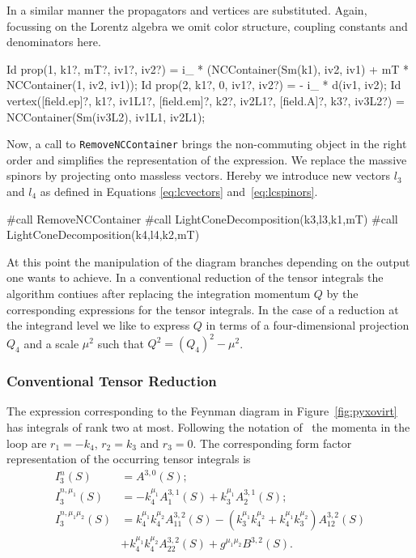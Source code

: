 \documentclass[preprint,number,12pt,sort&compress]{elsarticle}
\begin{document}
In a similar manner the propagators and vertices are substituted. Again,
focussing on the Lorentz algebra we omit color structure, coupling constants
and denominators here.
\begin{spform}
Id prop(1, k1?, mT?, iv1?, iv2?) =
   i_ * (NCContainer(Sm(k1), iv2, iv1)
      + mT * NCContainer(1, iv2, iv1));
Id prop(2, k1?, 0, iv1?, iv2?) = - i_ * d(iv1, iv2);
Id vertex([field.ep]?, k1?, iv1L1?,
          [field.em]?, k2?, iv2L1?,
          [field.A]?,  k3?, iv3L2?) =
   NCContainer(Sm(iv3L2), iv1L1, iv2L1);
\end{spform}
Now, a call to \texttt{RemoveNCContainer} brings the non-commuting
object in the right order and simplifies the representation of the
expression. We replace the massive spinors by projecting onto massless
vectors. Hereby we introduce new vectors $l_3$ and $l_4$ as defined
in Equations \eqref{eq:lcvectors} and~\eqref{eq:lcspinors}.
\begin{spform}
#call RemoveNCContainer
#call LightConeDecomposition(k3,l3,k1,mT)
#call LightConeDecomposition(k4,l4,k2,mT)
\end{spform}

At this point the manipulation of the diagram branches depending
on the output one wants to achieve. In a conventional reduction of
the tensor integrals the algorithm contiues after replacing the
integration momentum $Q$ by the corresponding expressions for the
tensor integrals. In the case of a reduction at the integrand level
we like to express $Q$ in terms of a four-dimensional projection
$Q_4$ and a scale $\mu^2$ such that $Q^2=(Q_4)^2-\mu^2$.

\subsubsection{Conventional Tensor Reduction}
The expression corresponding to the Feynman diagram in
Figure~\ref{fig:pyxovirt} has integrals of rank two at most.
Following the notation of~\cite{Binoth:2005ff} the momenta
in the loop are $r_1=-k_4$, $r_2=k_3$ and $r_3=0$. The corresponding
form factor representation of the occurring tensor integrals is
\begin{align}
I_3^n(S) &= A^{3,0}(S);\\
I_3^{n,\mu_1}(S) &= -k_4^{\mu_1} A^{3,1}_1(S) +k_3^{\mu_1} A^{3,1}_2(S);\\
I_3^{n,\mu_1\mu_2}(S) &=
      k_4^{\mu_1}k_4^{\mu_2} A^{3,2}_{11}(S)
    - (k_3^{\mu_1}k_4^{\mu_2}+k_4^{\mu_1}k_3^{\mu_2}) A^{3,2}_{12}(S)
\nonumber\\ &
    + k_4^{\mu_1}k_4^{\mu_2} A^{3,2}_{22}(S)
	 + g^{\mu_1\mu_2}B^{3,2}(S).
\end{align}
\end{document}
